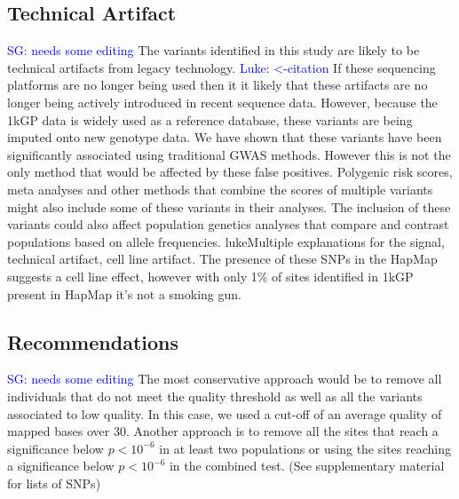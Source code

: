 \documentclass[9pt,lineno]{elife}
\newcommand{\sgcomment}[1]{\textcolor{blue}{SG: #1}}
\newcommand{\luke}[1]{\textcolor{blue}{Luke: #1}}
\newcommand{\todo}[1]{\textcolor{blue}{*#1*}}
\begin{document}
\subsection{Technical Artifact}
\sgcomment{needs some editing}
The variants identified in this study are likely to be technical artifacts from legacy technology.\citep{Minoche2011} \luke{<-citation} 
If these sequencing platforms are no longer being used then it it likely that these artifacts are no longer being actively introduced in recent sequence data.
However, because the 1kGP data is widely used as a reference database, these variants are being imputed onto new genotype data.
We have shown that these variants have been significantly associated using traditional GWAS methods.
However this is not the only method that would be affected by these false positives. 
Polygenic risk scores, meta analyses and other methods that combine the scores of multiple variants might also include some of these variants in their analyses.
The inclusion of these variants could also affect population genetics analyses that compare and contrast populations based on allele frequencies.
luke{Multiple explanations for the signal, technical artifact, cell line artifact. The presence of these SNPs in the HapMap suggests a cell line effect, however with only 1\% of sites identified in 1kGP present in HapMap it's not a smoking gun.}


\subsection{Recommendations}
\sgcomment{needs some editing}
The most conservative approach would be to remove all individuals that do not meet the quality threshold as well as all the variants associated to low quality.
In this case, we used a cut-off of an average quality of mapped bases over 30.
Another approach is to remove all the sites that reach a significance below $ p < 10^{-6}$ in at least two populations or using the sites reaching a significance below $ p < 10^{-6}$ in the combined test. (See supplementary material for lists of SNPs)
\end{document}
